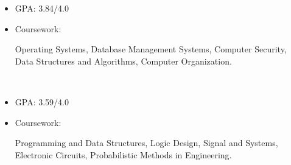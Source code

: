 \newcommand{\TUBentry}{
    \TUB
    \poswithprd{Introduction to 3D Scanning and Printing at TUB Winter University}{Jan 2018-Feb 2018}
    \begin{itemize}
        \item 
        Learned the basic of 3D scanning \& printing. Learned Blender for 3D modeling.
    \end{itemize}
}



\UM
{}
\begin{itemize}
    \item GPA: 3.84/4.0
    \item Coursework: 
    \begin{minipage}[t]{\courseworkwidth}
        Operating Systems,
        Database Management Systems,
        Computer Security,
        Data Structures and Algorithms,
        Computer Organization.
    \end{minipage}\\
\end{itemize}

\JI
{}
\begin{itemize}
    \item GPA: 3.59/4.0
    \item Coursework:
    \begin{minipage}[t]{\courseworkwidth}
        Programming and Data Structures,
        Logic Design,
        Signal and Systems,
        Electronic Circuits,
        Probabilistic Methods in Engineering.
    \end{minipage}\\
\end{itemize}